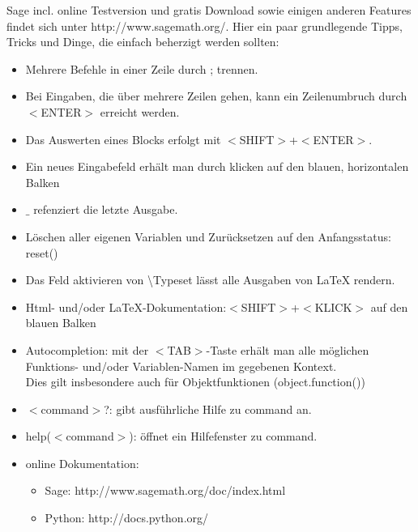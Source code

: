 \documentclass[fontsize=12pt,paper=a4,twoside,bibtotoc,idxtotoc,
liststotoc,pagesize,BCOR1.2cm,DIV15,chapterprefix,pagesize=pdftex]{scrbook}
\begin{document}
Sage incl. online Testversion und gratis Download sowie einigen anderen Features findet sich unter http://www.sagemath.org/.\newline
Hier ein paar grundlegende Tipps, Tricks und Dinge, die einfach beherzigt werden sollten:\newline
\begin{itemize}
 \item Mehrere Befehle in einer Zeile durch ; trennen. 
 \item Bei Eingaben, die über mehrere Zeilen gehen, kann ein
  Zeilenumbruch durch $<$ENTER$>$ erreicht werden.
 \item Das Auswerten eines Blocks erfolgt mit $<$SHIFT$>$+$<$ENTER$>$.
 \item Ein neues Eingabefeld erhält man durch klicken auf den blauen, horizontalen Balken
 \item $\_$ refenziert die letzte Ausgabe.
 \item Löschen aller eigenen Variablen und Zurücksetzen auf den Anfangsstatus: reset()
 \item Das Feld aktivieren von \textbackslash Typeset lässt alle Ausgaben von \LaTeX{} rendern.
  \item Html- und/oder \LaTeX-Dokumentation:$<$SHIFT$>$+$<$KLICK$>$ auf den blauen Balken
 \item Autocompletion: mit der $<$TAB$>$-Taste erhält man alle möglichen Funktions- und/oder Variablen-Namen im gegebenen Kontext.\\
  Dies gilt insbesondere auch für Objektfunktionen (object.function())
 \item $<$command$>$?: gibt ausführliche Hilfe zu command an.
 \item help($<$command$>$): öffnet ein Hilfefenster zu command.
 \item online Dokumentation:
  \begin{itemize}
   \item Sage: http://www.sagemath.org/doc/index.html
   \item Python: http://docs.python.org/
  \end{itemize}
\end{itemize}
\newpage
\end{document}
